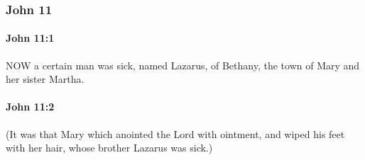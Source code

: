 	\subsubsection{John 11} %
		\label{JOHN-11}
		
		\paragraph{John 11:1} %
			\label{JOHN-11-1}

			NOW a certain man was sick, named Lazarus, of Bethany, the town of Mary and her sister Martha.

			\begin{framed}
				\scriptsize
				\begin{compactdesc}
					\item[SBLG] 
				\end{compactdesc}
			\end{framed}

		\paragraph{John 11:2} %
			\label{JOHN-11-2}

			(It was that Mary which anointed the Lord with ointment, and wiped his feet with her hair, whose brother Lazarus was sick.)

